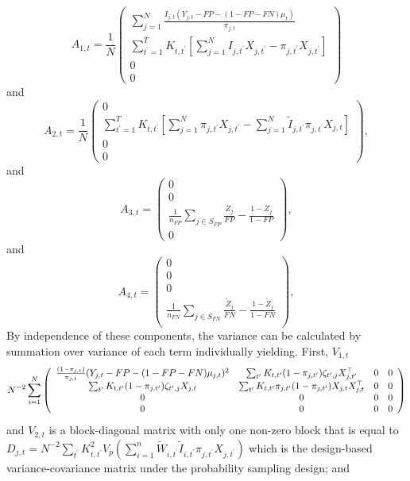 \documentclass[11pt]{amsart}
\numberwithin{equation}{section}
\theoremstyle{plain}
\begin{document}
$$
A_{1,t} = \frac{1}{N} \left( \begin{array}{c}
\sum_{j=1}^N \frac{I_{j,t} (Y_{j,t} - FP - (1-FP-FN) \mu_t)}{\pi_{j,t}} \\
\sum_{t^\prime = 1}^T K_{t,t^\prime} \left[ \sum_{j=1}^N I_{j,t^\prime} X_{j,t^\prime} - \pi_{j,t^\prime} X_{j,t^\prime} \right] \\
0 \\
0
\end{array}
\right)
$$
and
$$
A_{2,t} = \frac{1}{N} \left( \begin{array}{c}
0 \\
\sum_{t^\prime = 1}^T K_{t,t^\prime} \left[ \sum_{j=1}^N \pi_{j,t^\prime} X_{j,t^\prime} - \sum_{j=1}^N \tilde I_{j,t^\prime} \pi_{j,t^\prime} X_{j,t} \right] \\
0 \\
0
\end{array}
\right),
$$
and
$$
A_{3,t} = \left( \begin{array}{c}
0 \\
0 \\
\frac{1}{n_{FP}} \sum_{j \in S_{FP}} \frac{Z_j}{FP} - \frac{1-Z_j}{1-FP} \\
0
\end{array}
\right),
$$
and
$$
A_{4,t} = \left( \begin{array}{c}
0 \\
0 \\
0 \\
\frac{1}{n_{FN}} \sum_{j \in S_{FN}} \frac{\tilde Z_j}{FN} - \frac{1-\tilde Z_j}{1-FN} \\
\end{array}
\right),
$$
By independence of these components, the variance can be calculated by summation over variance of each term individually yielding. First, $V_{1,t}$
{
\tiny
$$
 N^{-2} \sum_{i=1}^N \left(
\begin{array}{c c c c}
\frac{(1-\pi_{j,t})}{\pi_{j,t}} (Y_{j,t} - FP - (1-FP-FN) \mu_{j,t})^2 & \sum_{t^\prime} K_{t,t^\prime} (1-\pi_{j,t^\prime}) \zeta_{t^\prime, j} X_{j,t^\prime}^\top & 0 & 0 \\
\sum_{t^\prime} K_{t,t^\prime} (1-\pi_{j,t^\prime}) \zeta_{t^\prime, j} X_{j,t}&
\sum_{t^\prime} K_{t,t^\prime} \pi_{j,t^\prime} (1-\pi_{j,t^\prime}) X_{j,t} X_{j,t}^\top
& 0 & 0 \\
0 & 0 & 0 & 0 \\
0 & 0 & 0 & 0 \\
\end{array}
\right)
$$
}
and $V_{2,t}$ is a block-diagonal matrix with only one non-zero block that is equal to $D_{j,t} = N^{-2} \sum_{t^\prime} K_{t,t^\prime}^2 V_p\left( \sum_{i=1}^n \tilde W_{i,t^\prime} \tilde I_{i,t^\prime}  \pi_{j,t^\prime} X_{j,t^\prime} \right)$ which is the design-based variance-covariance matrix under the probability sampling design; and
\end{document}
